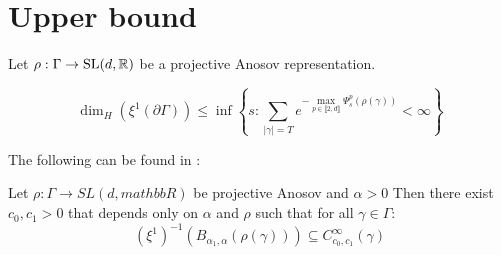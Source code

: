 \documentclass{report}
\begin{document}
\chapter{Upper bound}
\begin{lemma}
Let $\rho: \Gamma \to \operatorname{{\mathrm{SL}}}(d, \mathbb R)$ be a projective Anosov representation. 

\[
    \dim_H(\xi^1 (\partial \Gamma) ) \leq
    \inf 
    \left\{ 
        s :  
        \sum_{|\gamma| = T} e^{-\max\limits_{p \in \llbracket 2, d \rrbracket} \Psi_s^p(\rho(\gamma))}  < \infty
    \right\}
\]
\end{lemma}

The following can be found in \cite[Proposition 3.3]{pozzetti_anosov_2023}:
\begin{proposition}
    Let $\rho: \Gamma \to SL(d, mathbb R)$ be projective Anosov and $\alpha > 0$
    Then there exist $c_0, c_1 > 0$ that depends only on $\alpha$ and $\rho$ such that for all $\gamma \in \Gamma$:
    \[
        (\xi^1)^{-1}(B_{\alpha_1, \alpha}(\rho(\gamma))) \subseteq C_{c_0,c_1}^\infty(\gamma)
    \]
\end{proposition}
\end{document}
